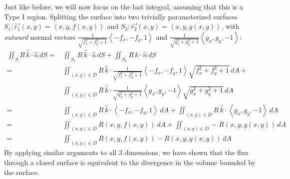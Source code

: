 \documentclass{article}
\newcommand{\vect}[1]{\ensuremath{\overrightarrow{#1}}}
\begin{document}
Just like before, we will now focus on the last integral, assuming that this is a Type I region. Splitting the surface into two trivially parameterized surfaces $S_1:\vect{r_1}(x,y)=\left\langle x,y, f(x,y) \right\rangle$ and $S_2:\vect{r_2}(x,y)=\left\langle x,y,g(x,y) \right\rangle$, with \textit{outward} normal vectors $\frac{1}{\sqrt{f_x^2+f_y^2+1}}\left\langle -f_x,-f_y,1\right\rangle$ and $\frac{1}{\sqrt{g_x^2+g_y^2+1}}\left\langle g_x,g_y,-1\right\rangle$:
\begin{align*}
    \iint_S R \,\hat{k}\cdot\hat{n}\,dS =& \iint_{S_1} R\,\hat{k}\cdot\hat{n}\,dS + \iint_{S_2} R\,\hat{k}\cdot\hat{n}\,dS\\
    =& \iint_{(x,y)\in D} R\,\hat{k}\cdot\frac{1}{\sqrt{f_x^2+f_y^2+1}}\left\langle -f_x,-f_y,1\right\rangle\sqrt{f_x^2+f_y^2+1}\,dA + \\&\iint_{(x,y)\in D} R\,\hat{k}\cdot\frac{1}{\sqrt{g_x^2+g_y^2+1}}\left\langle g_x,g_y,-1\right\rangle\sqrt{g_x^2+g_y^2+1}\,dA\\
    =& \iint_{(x,y)\in D} R\,\hat{k}\cdot\left\langle -f_x,-f_y,1\right\rangle\,dA +\iint_{(x,y)\in D} R\,\hat{k}\cdot\left\langle g_x,g_y,-1\right\rangle\,dA\\
    =& \iint_{(x,y)\in D} R(x,y,f(x,y))\, dA +\iint_{(x,y)\in D} -R(x,y,g(x,y))\,dA\\
    =& \iint_{(x,y)\in D} R(x,y,f(x,y)) -R(x,y,g(x,y))\,dA
\end{align*}
By applying similar arguments to all 3 dimensions, we have shown that the flux through a closed surface is equivalent to the divergence in the volume bounded by the surface.
\end{document}
